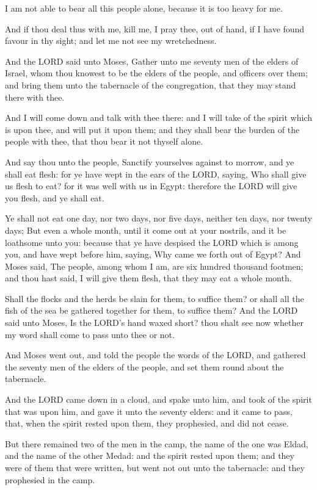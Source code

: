 \Verse I am not able to bear all this people alone, because it is too
heavy for me.

\Verse And if thou deal thus with me, kill me, I pray thee, out of
hand, if I have found favour in thy sight; and let me not see my
wretchedness.

\Verse And the LORD said unto Moses, Gather unto me seventy men of the
elders of Israel, whom thou knowest to be the elders of the people,
and officers over them; and bring them unto the tabernacle of the
congregation, that they may stand there with thee.

\Verse And I will come down and talk with thee there: and I will take
of the spirit which is upon thee, and will put it upon them; and they
shall bear the burden of the people with thee, that thou bear it not
thyself alone.

\Verse And say thou unto the people, Sanctify yourselves against to
morrow, and ye shall eat flesh: for ye have wept in the ears of the
LORD, saying, Who shall give us flesh to eat? for it was well with us
in Egypt: therefore the LORD will give you flesh, and ye shall eat.

\Verse Ye shall not eat one day, nor two days, nor five days, neither
ten days, nor twenty days; \Verse But even a whole month, until it come
out at your nostrils, and it be loathsome unto you: because that ye
have despised the LORD which is among you, and have wept before him,
saying, Why came we forth out of Egypt?  \Verse And Moses said, The
people, among whom I am, are six hundred thousand footmen; and thou
hast said, I will give them flesh, that they may eat a whole month.

\Verse Shall the flocks and the herds be slain for them, to suffice
them?  or shall all the fish of the sea be gathered together for them,
to suffice them?  \Verse And the LORD said unto Moses, Is the LORD's
hand waxed short? thou shalt see now whether my word shall come to
pass unto thee or not.

\Verse And Moses went out, and told the people the words of the LORD,
and gathered the seventy men of the elders of the people, and set them
round about the tabernacle.

\Verse And the LORD came down in a cloud, and spake unto him, and took
of the spirit that was upon him, and gave it unto the seventy elders:
and it came to pass, that, when the spirit rested upon them, they
prophesied, and did not cease.

\Verse But there remained two of the men in the camp, the name of the
one was Eldad, and the name of the other Medad: and the spirit rested
upon them; and they were of them that were written, but went not out
unto the tabernacle: and they prophesied in the camp.


